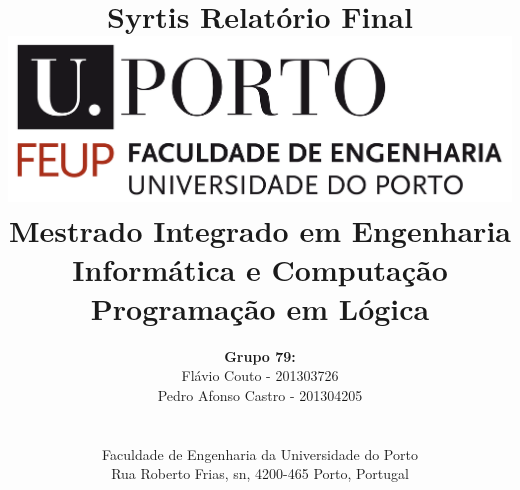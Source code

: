 \documentclass[a4paper]{article}
\begin{document}
\setlength{\textwidth}{16cm}
\setlength{\textheight}{22cm}

\title{\Huge\textbf{Syrtis}\linebreak\linebreak\linebreak
\Large\textbf{Relatório Final}\linebreak\linebreak
\linebreak\linebreak
\includegraphics[scale=0.1]{feup-logo.png}\linebreak\linebreak
\linebreak\linebreak
\Large{Mestrado Integrado em Engenharia Informática e Computação} \linebreak\linebreak
\Large{Programação em Lógica}\linebreak
}

\author{\textbf{Grupo 79:}\\
Flávio Couto - 201303726 \\
Pedro Afonso Castro - 201304205 \\
\linebreak\linebreak \\
 \\ Faculdade de Engenharia da Universidade do Porto \\ Rua Roberto Frias, s\/n, 4200-465 Porto, Portugal \linebreak\linebreak\linebreak
\linebreak\linebreak\vspace{1cm}}
\maketitle
\thispagestyle{empty}
\end{document}
